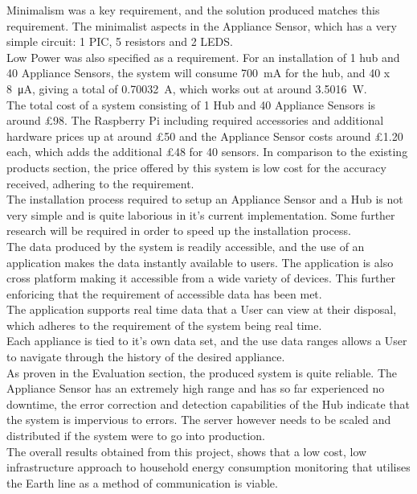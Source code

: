 \documentclass[preprint,12pt,3p]{elsarticle}
\begin{document}
Minimalism was a key requirement, and the solution produced matches this requirement. The minimalist aspects in the Appliance Sensor, which has a very simple circuit: 1 PIC, 5 resistors and 2 LEDS.\\
Low Power was also specified as a requirement. For an installation of 1 hub and 40 Appliance Sensors, the system will consume \SI{700}{\milli\ampere} for the hub, and 40 x \SI{8}{\micro\ampere}, giving a total of \SI{0.70032}{\ampere}, which works out at around \SI{3.5016}{\watt}.\\
The total cost of a system consisting of 1 Hub and 40 Appliance Sensors is around \pounds98. The Raspberry Pi including required accessories and additional hardware prices up at around \pounds50 and the Appliance Sensor costs around \pounds1.20 each, which adds the additional \pounds48 for 40 sensors. In comparison to the existing products section, the price offered by this system is low cost for the accuracy received, adhering to the requirement.\\
The installation process required to setup an Appliance Sensor and a Hub is not very simple and is quite laborious in it's current implementation. Some further research will be required in order to speed up the installation process.\\
The data produced by the system is readily accessible, and the use of an application makes the data instantly available to users. The application is also cross platform making it accessible from a wide variety of devices. This further enforicing that the requirement of accessible data has been met.\\
The application supports real time data that a User can view at their disposal, which adheres to the requirement of the system being real time.\\
Each appliance is tied to it's own data set, and the use data ranges allows a User to navigate through the history of the desired appliance.\\
As proven in the Evaluation section, the produced system is quite reliable. The Appliance Sensor has an extremely high range and has so far experienced no downtime, the error correction and detection capabilities of the Hub indicate that the system is impervious to errors. The server however needs to be scaled and distributed if the system were to go into production.\\
The overall results obtained from this project, shows that a low cost, low infrastructure approach to household energy consumption monitoring that utilises the Earth line as a method of communication is viable.
\end{document}
